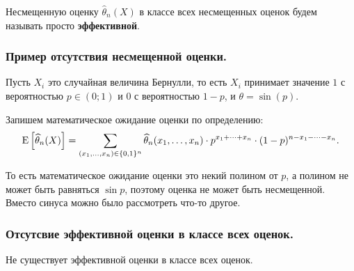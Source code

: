 \begin{definition*}
    Несмещенную оценку $\widehat{\theta}_n(X)$ в классе всех несмещенных оценок будем называть просто \textbf{эффективной}.
\end{definition*} 

\subsubsection{Пример отсутствия несмещенной оценки.}

\begin{example}
    Пусть $X_i$ это случайная величина Бернулли, то есть $X_i$ принимает значение $1$ с вероятностью $p \in (0; 1)$ и $0$ с вероятностью $1 - p$, и $\theta = \sin(p)$.

    Запишем математическое ожидание оценки по определению:
    \begin{equation*}
        \operatorname{E} \left[\widehat{\theta}_n(X)\right]
        = \sum_{(x_1, \dots, x_n) \in \{0, 1\}^n} \widehat{\theta}_n (x_1, \dots, x_n) \cdot p^{x_1 + \dots + x_n} \cdot (1 - p)^{n - x_1 - \dots - x_n}.
    \end{equation*}

    То есть математическое ожидание оценки это некий полином от $p$, а полином не может быть равняться $\sin p$, поэтому оценка не может быть несмещенной. Вместо синуса можно было рассмотреть что-то другое.
\end{example}

\subsubsection{Отсутсвие эффективной оценки в классе всех оценок.}

\begin{proposition*}
    Не существует эффективной оценки в классе всех оценок.
\end{proposition*}

